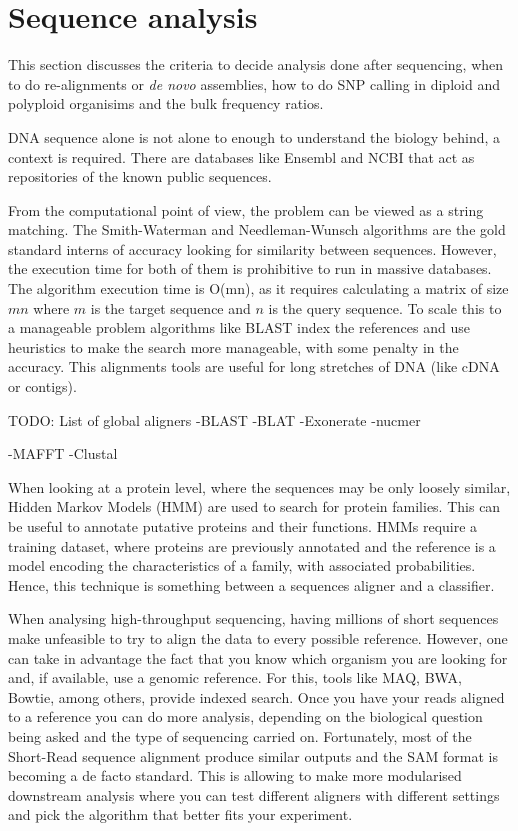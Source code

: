 \section{Sequence analysis}
This section discusses the criteria to decide analysis done after sequencing, when to do re-alignments or \textit{de novo} assemblies, how to do SNP calling in diploid and polyploid organisims and the bulk frequency ratios.  



DNA sequence alone is not alone to enough to understand the biology behind, a context is required. There are databases like Ensembl and NCBI that act as repositories of the known public sequences. 

From the computational point of view, the problem can be viewed as a string matching. The Smith-Waterman\cite{Smith1981} and Needleman-Wunsch\cite{Needleman1970} algorithms are the gold standard interns of accuracy looking for similarity between sequences. However, the execution time for both of them is prohibitive to run in massive databases. The algorithm execution time is O(mn), as it requires calculating a matrix of size $mn$ where $m$ is the target sequence and $n$ is the query sequence.  To scale this to a manageable problem algorithms like BLAST index the references and use heuristics to make the search more manageable, with some penalty in the accuracy. This alignments tools are useful for long stretches of DNA (like cDNA or contigs)\cite{Altschul1990}.

TODO: List of global aligners
-BLAST
-BLAT
-Exonerate
-nucmer

-MAFFT
-Clustal


When looking at a protein level, where the sequences may be only loosely similar, Hidden Markov Models (HMM) are used to search for protein families. This can be useful to annotate putative proteins and their functions. HMMs require a training dataset, where proteins are previously annotated and the reference is a model encoding the characteristics of a family, with associated probabilities. Hence, this technique is something between a sequences aligner and a classifier\cite{Eddy2004}. 

When analysing high-throughput sequencing, having millions of short sequences make unfeasible to try to align the data to every possible reference. However, one can take in advantage the fact that you know which organism you are looking for and, if available, use a genomic reference. For this, tools like MAQ, BWA, Bowtie, among others, provide indexed search.  Once you have your reads aligned to a reference you can do more analysis, depending on the biological question being asked and the type of sequencing carried on.  Fortunately, most of the Short-Read sequence alignment produce similar outputs and the SAM format is becoming a de facto standard. This is allowing to make more modularised downstream analysis where you can test different aligners with different settings and pick the algorithm that better fits your experiment\cite{Liu2012,Li2009,Li2009a}. 

